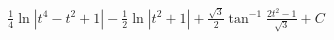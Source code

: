 \documentclass[preview]{standalone}
\begin{document}
\begin{align*}
\frac{1}{4}\ln|t^4-t^2+1|-\frac{1}{2}\ln|t^2+1|+\frac{\sqrt3}{2}\tan^{-1}\frac{2t^2-1}{\sqrt3}+C
\end{align*}
\end{document}
